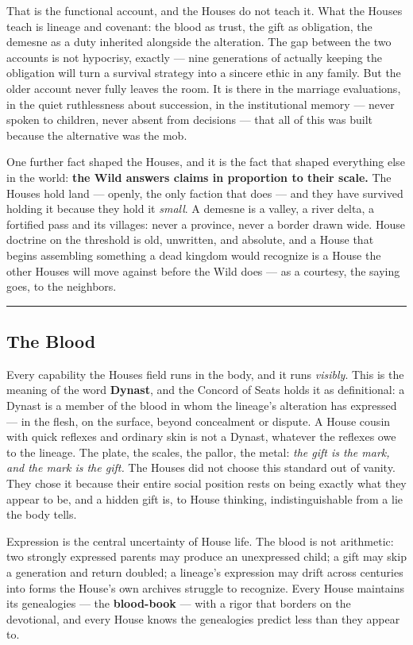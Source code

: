 That is the functional account, and the Houses do not teach it. What the Houses teach is lineage and covenant: the blood as trust, the gift as obligation, the demesne as a duty inherited alongside the alteration. The gap between the two accounts is not hypocrisy, exactly --- nine generations of actually keeping the obligation will turn a survival strategy into a sincere ethic in any family. But the older account never fully leaves the room. It is there in the marriage evaluations, in the quiet ruthlessness about succession, in the institutional memory --- never spoken to children, never absent from decisions --- that all of this was built because the alternative was the mob.

One further fact shaped the Houses, and it is the fact that shaped everything else in the world: \textbf{the Wild answers claims in proportion to their scale.} The Houses hold land --- openly, the only faction that does --- and they have survived holding it because they hold it \textit{small}. A demesne is a valley, a river delta, a fortified pass and its villages: never a province, never a border drawn wide. House doctrine on the threshold is old, unwritten, and absolute, and a House that begins assembling something a dead kingdom would recognize is a House the other Houses will move against before the Wild does --- as a courtesy, the saying goes, to the neighbors.

\medskip\hrule\medskip

\subsection{The Blood}

Every capability the Houses field runs in the body, and it runs \textit{visibly}. This is the meaning of the word \textbf{Dynast}, and the Concord of Seats holds it as definitional: a Dynast is a member of the blood in whom the lineage's alteration has expressed --- in the flesh, on the surface, beyond concealment or dispute. A House cousin with quick reflexes and ordinary skin is not a Dynast, whatever the reflexes owe to the lineage. The plate, the scales, the pallor, the metal: \textit{the gift is the mark, and the mark is the gift.} The Houses did not choose this standard out of vanity. They chose it because their entire social position rests on being exactly what they appear to be, and a hidden gift is, to House thinking, indistinguishable from a lie the body tells.

Expression is the central uncertainty of House life. The blood is not arithmetic: two strongly expressed parents may produce an unexpressed child; a gift may skip a generation and return doubled; a lineage's expression may drift across centuries into forms the House's own archives struggle to recognize. Every House maintains its genealogies --- the \textbf{blood-book} --- with a rigor that borders on the devotional, and every House knows the genealogies predict less than they appear to.

